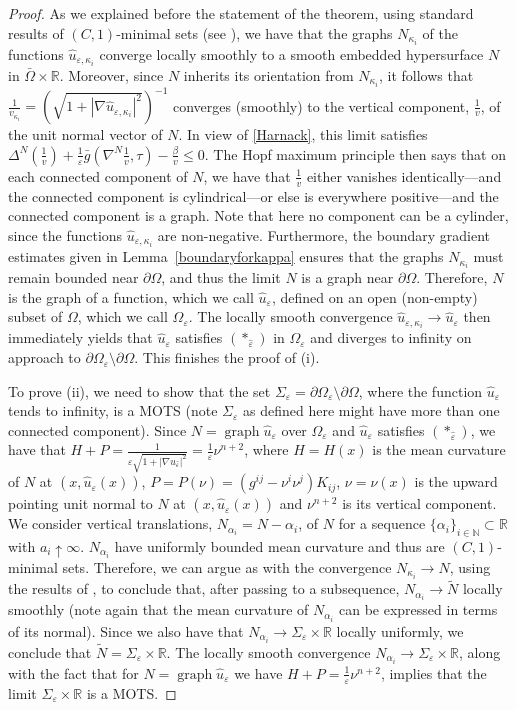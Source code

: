 \documentclass[11pt]{amsart}
\renewcommand{\epsilon}{\varepsilon}
\DeclareMathOperator{\graph}{graph} \DeclareMathOperator{\closure}{Closure}
\def\R{\mathbb{R}}
\def\N{\mathbb{N}}
\def\a{\alpha}
\def\e{\epsilon}
\def\k{\kappa}
\def\wt{\widetilde}
\begin{document}
\begin{proof}
As we explained before the statement  of the theorem, using standard results of $(C,1)$-minimal sets (see \cite{MaMi}), we have  that the graphs $N_{\k_ i}$ of the functions $\hat{u}_{\varepsilon,\k_i}$ converge locally smoothly to  a smooth embedded hypersurface $N$ in $\bar{\Omega}\times\mathbb{R}$. Moreover, since $N$ inherits its orientation from $N_{\k_i}$,  it follows that $\frac{1}{v_{\k_i}}=(\sqrt{1+|\nabla\hat{u}_{\varepsilon, \k_i}|^2})^{-1}$ converges (smoothly) to the vertical component, $\frac{1}{v}$, of the unit normal vector of $N$.   In view of \eqref{Harnack}, this limit satisfies $\Delta^N\left(\frac{1}{v}\right)+\frac{1}{\varepsilon}\bar g\left(\nabla^N \frac{1}{v},\tau\right)-\frac{\beta}{v}\leq0$. The Hopf maximum principle then says that on each connected component of $N$, we have that $\frac{1}{v}$ either vanishes identically---and the connected component is cylindrical---or else is everywhere positive---and the connected component is a graph. Note that here no component can be a cylinder, since the functions $\hat{u}_{\varepsilon,\k_i}$ are non-negative. Furthermore, the boundary gradient estimates given in Lemma~\ref{boundaryforkappa} ensures that the graphs $N_{\k_i}$ must remain bounded near $\partial\Omega$, and thus  the limit $N$ is a graph near $\partial\Omega$.
Therefore, $N$ is the graph of a function, which we call $\hat{u}_{\varepsilon}$, defined on an open (non-empty) subset of $\Omega$, which we call $\Omega_\e$. The locally smooth convergence $\hat u_{\e, \k_i}\to\hat u_\e$ then immediately yields that $\hat{u}_{\varepsilon}$ satisfies $(*_{\hat\varepsilon})$ in ${\Omega}_\e$ and diverges to infinity on approach to $\partial\Omega_\e\setminus\partial\Omega$.  This finishes the proof of (i).

To prove (ii), we need to show that the set $\Sigma_\e=\partial\Omega_\e\setminus \partial \Omega$, where the function $\hat u_\e$ tends to infinity, is a MOTS (note $\Sigma_\e$ as defined here might have more than one connected component). Since $N=\graph \hat u_\e$ over $\Omega_\e$ and $\hat u_\e$ satisfies $(*_{\hat\varepsilon})$, we have that
$H+P=\frac{1}{\e\sqrt{1+|\nabla u_{\hat\e}|^2}}=\frac 1\e \nu^{n+2}$, where $H=H(x)$ is the mean curvature of $N$ at $(x, \hat u_\e(x))$, $P=P(\nu)=(g^{ij}-\nu^i\nu^j)K_{ij}$, $\nu=\nu(x)$ is the upward pointing unit normal to $N$ at $(x, \hat u_\e(x))$ and $\nu^{n+2}$ is its vertical component. We consider vertical translations, $N_{\a_i}= N-\a_i$, of $N$ for a sequence $\{\a_i\}_{i\in\N}\subset \R$ with $a_i\uparrow \infty$. $N_{\a_i}$ have uniformly bounded mean curvature and thus are  $(C,1)$-minimal sets. Therefore, we can argue as with the convergence $N_{\k_ i}\to N$, using the results of \cite{DS93, MaMi}, to conclude that, after passing to a subsequence, $N_{\a_i}\to \wt N$ locally smoothly (note again that the mean curvature of $N_{\a_i}$ can be expressed in terms of its normal). Since we also have that $N_{\a_i}\to \Sigma_\e\times \R$ locally uniformly, we conclude that $\wt N =\Sigma_\e\times \R$. The locally smooth convergence $N_{\a_i}\to \Sigma_\e\times \R$, along with the fact that for $N=\graph \hat u_\e$ we have
$H+P=\frac 1\e \nu^{n+2}$, implies that the limit  $\Sigma_\e\times \R$ is a MOTS.


\end{proof}
\end{document}
